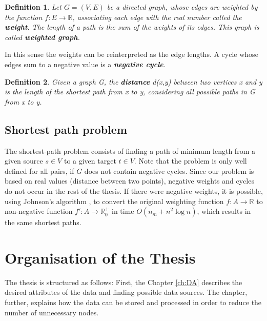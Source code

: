 \documentclass[thesis=M,english]{FITthesis}[2012/10/20]
\newtheorem{defin}{Definition}
\begin{document}
\begin{defin}
Let $G = (V, E)$ be a directed graph, whose edges are weighted by the function $f: E \to \mathbb{R}$, associating each edge with the real number called the \textbf{weight}. 
The length of a path is the sum of the weights of its edges. This graph is called \textbf{weighted graph}.  
\end{defin}

In this sense the weights can be reinterpreted as the edge lengths. A cycle whose edges sum to a negative value is a \textit{\textbf{negative cycle}}. 

\begin{defin}
Given a graph G, the \textbf{distance} d(x,y) between two vertices x and y is the length of the shortest path from x to y, considering all possible paths in G from x to y. 
\end{defin}



\subsection{Shortest path problem}
\label{sec:SPP}


The shortest-path problem consists of finding a path of minimum length from a given source $s \in V$ to a given target $t \in V$.
Note that the problem is only well defined for all pairs, if $G$ does not contain negative cycles.
Since our problem is based on real values (distance between two points), negative weights and cycles do not occur in the rest of the thesis.
If there were negative weights, it is possible, using Johnson's algorithm \cite{Johnson77}, to convert the original weighting function $f: A \to \mathbb{R}$ to non-negative function $ f': A \to \mathbb{R}^+_0$ in time $O(n_m + n^2 \log n)$, which results in the same shortest paths.

\section{Organisation of the Thesis}
The thesis is structured as follows: First, the Chapter \ref{ch:DA} describes the desired attributes of the data and finding possible data sources. The chapter, further, explains how the data can be stored and processed in order to reduce the number of unnecessary nodes. 
\end{document}
